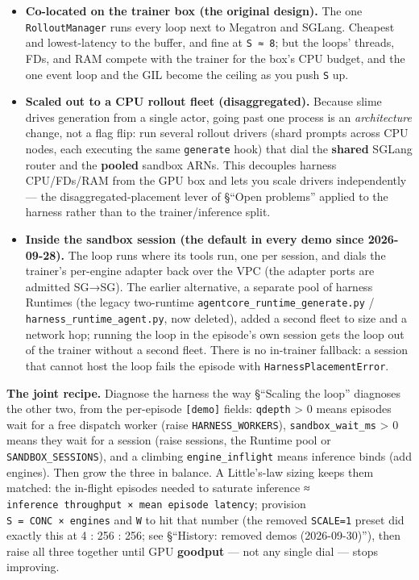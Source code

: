 \documentclass[
  paper=a4,
  ,captions=tableheading
]{scrartcl}
\providecommand{\tightlist}{%
  \setlength{\itemsep}{0pt}\setlength{\parskip}{0pt}}
\begin{document}
\begin{itemize}
\tightlist
\item
  \textbf{Co-located on the trainer box (the original design).} The one
  \texttt{RolloutManager} runs every loop next to Megatron and SGLang.
  Cheapest and lowest-latency to the buffer, and fine at
  \texttt{S\ ≈\ 8}; but the loops' threads, FDs, and RAM compete with
  the trainer for the box's CPU budget, and the one event loop and the
  GIL become the ceiling as you push \texttt{S} up.
\item
  \textbf{Scaled out to a CPU rollout fleet (disaggregated).} Because
  slime drives generation from a single actor, going past one process is
  an \emph{architecture} change, not a flag flip: run several rollout
  drivers (shard prompts across CPU nodes, each executing the same
  \texttt{generate} hook) that dial the \textbf{shared} SGLang router
  and the \textbf{pooled} sandbox ARNs. This decouples harness
  CPU/FDs/RAM from the GPU box and lets you scale drivers independently
  --- the disaggregated-placement lever of §``Open problems'' applied to
  the harness rather than to the trainer/inference split.
\item
  \textbf{Inside the sandbox session (the default in every demo since
  2026-09-28).} The loop runs where its tools run, one per session, and
  dials the trainer's per-engine adapter back over the VPC (the adapter
  ports are admitted SG→SG). The earlier alternative, a separate pool of
  harness Runtimes (the legacy two-runtime
  \texttt{agentcore\_runtime\_generate.py} /
  \texttt{harness\_runtime\_agent.py}, now deleted), added a second
  fleet to size and a network hop; running the loop in the episode's own
  session gets the loop out of the trainer without a second fleet. There
  is no in-trainer fallback: a session that cannot host the loop fails
  the episode with \texttt{HarnessPlacementError}.
\end{itemize}

\textbf{The joint recipe.} Diagnose the harness the way §``Scaling the
loop'' diagnoses the other two, from the per-episode \texttt{{[}demo{]}}
fields: \texttt{qdepth} \textgreater{} 0 means episodes wait for a free
dispatch worker (raise \texttt{HARNESS\_WORKERS}),
\texttt{sandbox\_wait\_ms} \textgreater{} 0 means they wait for a
session (raise sessions, the Runtime pool or
\texttt{SANDBOX\_SESSIONS}), and a climbing \texttt{engine\_inflight}
means inference binds (add engines). Then grow the three in balance. A
Little's-law sizing keeps them matched: the in-flight episodes needed to
saturate inference ≈
\texttt{inference\ throughput\ ×\ mean\ episode\ latency}; provision
\texttt{S\ =\ CONC\ ×\ engines} and \texttt{W} to hit that number (the
removed \texttt{SCALE=1} preset did exactly this at 4 : 256 : 256; see
§``History: removed demos (2026-09-30)''), then raise all three together
until GPU \textbf{goodput} --- not any single dial --- stops improving.
\end{document}
